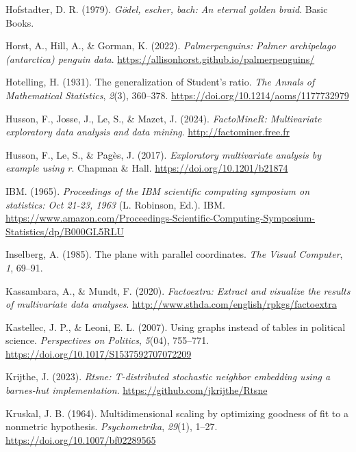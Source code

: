 \documentclass[
  letterpaper,
  10pt,
  krantz2]{krantz}
\newlength{\cslhangindent}
\newenvironment{CSLReferences}[2] %
 {\begin{list}{}{%
  \setlength{\itemindent}{0pt}
  \setlength{\leftmargin}{0pt}
  \setlength{\parsep}{0pt}
  \ifodd #1
   \setlength{\leftmargin}{\cslhangindent}
   \setlength{\itemindent}{-1\cslhangindent}
  \fi
  \setlength{\itemsep}{#2\baselineskip}}}
 {\end{list}}
\begin{document}
\begin{CSLReferences}{1}{0}
Hofstadter, D. R. (1979). \emph{Gödel, escher, bach: An eternal golden
braid}. Basic Books.

Horst, A., Hill, A., \& Gorman, K. (2022). \emph{Palmerpenguins: Palmer
archipelago (antarctica) penguin data}.
\url{https://allisonhorst.github.io/palmerpenguins/}

Hotelling, H. (1931). The generalization of {Student's} ratio. \emph{The
Annals of Mathematical Statistics}, \emph{2}(3), 360--378.
\url{https://doi.org/10.1214/aoms/1177732979}

Husson, F., Josse, J., Le, S., \& Mazet, J. (2024). \emph{FactoMineR:
Multivariate exploratory data analysis and data mining}.
\url{http://factominer.free.fr}

Husson, F., Le, S., \& Pagès, J. (2017). \emph{Exploratory multivariate
analysis by example using r}. Chapman \& Hall.
\url{https://doi.org/10.1201/b21874}

IBM. (1965). \emph{Proceedings of the IBM scientific computing symposium
on statistics: Oct 21-23, 1963} (L. Robinson, Ed.). IBM.
\url{https://www.amazon.com/Proceedings-Scientific-Computing-Symposium-Statistics/dp/B000GL5RLU}

Inselberg, A. (1985). The plane with parallel coordinates. \emph{The
Visual Computer}, \emph{1}, 69--91.

Kassambara, A., \& Mundt, F. (2020). \emph{Factoextra: Extract and
visualize the results of multivariate data analyses}.
\url{http://www.sthda.com/english/rpkgs/factoextra}

Kastellec, J. P., \& Leoni, E. L. (2007). Using graphs instead of tables
in political science. \emph{Perspectives on Politics}, \emph{5}(04),
755--771. \url{https://doi.org/10.1017/S1537592707072209}

Krijthe, J. (2023). \emph{Rtsne: T-distributed stochastic neighbor
embedding using a barnes-hut implementation}.
\url{https://github.com/jkrijthe/Rtsne}

Kruskal, J. B. (1964). Multidimensional scaling by optimizing goodness
of fit to a nonmetric hypothesis. \emph{Psychometrika}, \emph{29}(1),
1--27. \url{https://doi.org/10.1007/bf02289565}


\end{CSLReferences}
\end{document}
